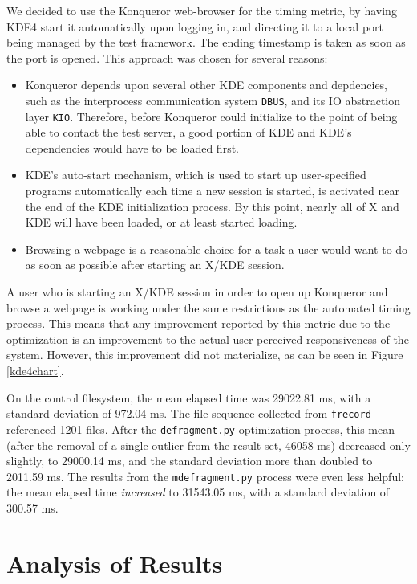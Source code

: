 \documentclass[10pt,twocolumn,letterpaper]{article}
\begin{document}
We decided to use the Konqueror web-browser for the timing metric, by having KDE4 start it automatically upon logging in, and directing it to a local port being managed by the test framework. The ending timestamp is taken as soon as the port is opened. This approach was chosen for several reasons:
\begin{itemize}
\item Konqueror depends upon several other KDE components and depdencies, such as the interprocess communication system \texttt{DBUS}\cite{dbus}, and its IO abstraction layer \texttt{KIO}. Therefore, before Konqueror could initialize to the point of being able to contact the test server, a good portion of KDE and KDE's dependencies would have to be loaded first.
\item KDE's auto-start mechanism, which is used to start up user-specified programs automatically each time a new session is started, is activated near the end of the KDE initialization process\cite{kdeautostart}. By this point, nearly all of X and KDE will have been loaded, or at least started loading.
\item Browsing a webpage is a reasonable choice for a task a user would want to do as soon as possible after starting an X/KDE session. 
\end{itemize}

A user who is starting an X/KDE session in order to open up Konqueror and browse a webpage is working under the same restrictions as the automated timing process. This means that any improvement reported by this metric due to the optimization is an improvement to the actual user-perceived responsiveness of the system. However, this improvement
did not materialize, as can be seen in Figure \ref{kde4chart}.

On the control filesystem, the mean elapsed time was 29022.81 ms, with a standard deviation of 972.04 ms. The file sequence collected from \texttt{frecord} referenced 1201 files. After the \texttt{defragment.py} optimization process, this mean (after the removal of a single outlier from the result set, 46058 ms) decreased only slightly, to 29000.14 ms, and the standard deviation more than doubled to 2011.59 ms. The results from the \texttt{mdefragment.py} process were even less helpful: the mean elapsed time \emph{increased} to 31543.05 ms, with a standard deviation of 300.57 ms.

\section{Analysis of Results}
\end{document}
